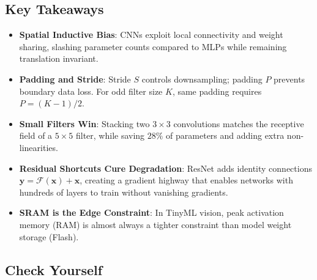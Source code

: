 \subsection{Key Takeaways}\label{subsec:takeaways}

\begin{takeaways}
\begin{itemize}
    \item \textbf{Spatial Inductive Bias}: CNNs exploit local connectivity and weight sharing, slashing parameter counts compared to MLPs while remaining translation invariant.
    \item \textbf{Padding and Stride}: Stride $S$ controls downsampling; padding $P$ prevents boundary data loss. For odd filter size $K$, same padding requires $P = (K-1)/2$.
    \item \textbf{Small Filters Win}: Stacking two $3 \times 3$ convolutions matches the receptive field of a $5 \times 5$ filter, while saving $28\%$ of parameters and adding extra non-linearities.
    \item \textbf{Residual Shortcuts Cure Degradation}: ResNet adds identity connections $\mathbf{y} = \mathcal{F}(\mathbf{x}) + \mathbf{x}$, creating a gradient highway that enables networks with hundreds of layers to train without vanishing gradients.
    \item \textbf{SRAM is the Edge Constraint}: In TinyML vision, peak activation memory (RAM) is almost always a tighter constraint than model weight storage (Flash).
\end{itemize}
\end{takeaways}

\subsection{Check Yourself}\label{subsec:check_yourself}

